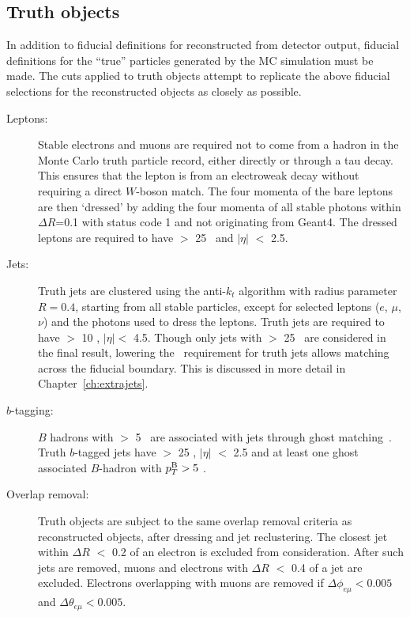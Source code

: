 \subsection{Truth objects}
In addition to fiducial definitions for reconstructed from detector output, fiducial definitions for the ``true'' particles generated by the MC simulation must be made. The cuts applied to truth objects attempt to replicate the above fiducial selections for the reconstructed objects as closely as possible.

\begin{description}
\item[Leptons:] Stable electrons and muons are required not to come from a hadron in the Monte Carlo truth particle record, either directly or through a tau decay. This ensures that the lepton is from an electroweak decay without requiring a direct $W$-boson match. The four momenta of the bare leptons are then `dressed' by adding the four momenta of all stable photons within $\Delta R$=0.1 with status code 1 and not originating from Geant4. The dressed leptons are required to have \pt $>$ 25 \GeV\ and $|\eta|$ $<$ 2.5.
\item[Jets:] Truth jets are clustered using the anti-$k_t$ algorithm  with radius parameter $R=0.4$, starting from all stable particles, except for selected leptons ($e$, $\mu$, $\nu$) and the photons used to dress the leptons. Truth jets are required to have \pT $>$ 10 \GeV, $|\eta| <$ 4.5. Though only jets with \pT $>$ 25 \GeV\ are considered in the final result, lowering the \pt\ requirement for truth jets allows matching across the fiducial boundary. This is discussed in more detail in Chapter~\ref{ch:extrajets}.

\item[$b$-tagging:] $B$ hadrons with \pT $>$ 5 \GeV\ are associated with jets through ghost matching~\cite{ghostmatch}. Truth $b$-tagged jets have \pT $>$ 25 \GeV, $|\eta|$ $<$ 2.5 and at least one ghost associated $B$-hadron with $p^{{\textrm B}}_{T} > 5$ \GeV.

\item[Overlap removal:] Truth objects are subject to the same overlap removal criteria as reconstructed objects, after dressing and jet reclustering. The closest jet within $\Delta R$ $<$ 0.2 of an electron is excluded from consideration.  After such jets are removed, 
muons  and electrons with $\Delta R$ $<$ 0.4 of a jet are excluded. Electrons overlapping with muons are removed if $\Delta \phi_{e\mu} < 0.005$ and $\Delta \theta_{e\mu} < 0.005$.
\end{description}


